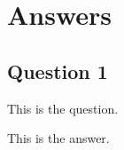 \chapter{Answers}
\label{cp:answers}
\section{Question 1}
\begin{importantbox}
    This is the question.
\end{importantbox}
\noindent{}This is the answer.
